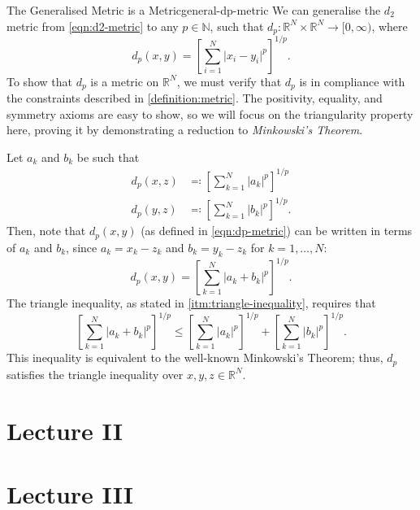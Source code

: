 \documentclass{article}
\numberwithin{equation}{section}
\numberwithin{enumi}{section}
\begin{document}
\begin{theorem}{The Generalised Metric is a Metric}{general-dp-metric}
    We can generalise the $d_2$ metric from \cref{eqn:d2-metric} to any $ p
    \in \mathbb{N} $, such that $ d_p \colon \mathbb{R}^N \times \mathbb{R}^N
    \to [0, \infty) $, where
    \begin{equation}
        d_p(x, y) = \left[\sum_{i=1}^N \vert x_i - y_i \vert^p\right]^{1/p}.
        \label{eqn:dp-metric}
    \end{equation}
    To show that $ d_p $ is a metric on $ \mathbb{R}^N $, we must verify that $
    d_p $ is in compliance with the constraints described in
    \cref{definition:metric}. The positivity, equality, and symmetry axioms are
    easy to show, so we will focus on the triangularity property here, proving
    it by demonstrating a reduction to \emph{Minkowski's Theorem}.

    Let $ a_k $ and $ b_k $ be such that
    \begin{align}
        d_p(x, z) &\eqcolon \left[\sum_{k=1}^N \vert a_k \vert^p\right]^{1/p} \\
        d_p(y, z) &\eqcolon \left[\sum_{k=1}^N \vert b_k \vert^p\right]^{1/p}.
    \end{align}
    Then, note that $ d_p(x, y) $ (as defined in \cref{eqn:dp-metric}) can be
    written in terms of $ a_k $ and $ b_k $, since $ a_k = x_k - z_k $ and $ b_k
    = y_k - z_k $ for $ k = 1, \ldots, N $:
    \begin{equation}
        d_p(x, y) = \left[\sum_{k=1}^N \vert a_k + b_k \vert^p\right]^{1/p}.
    \end{equation}
    The triangle inequality, as stated in \cref{itm:triangle-inequality},
    requires that
    \begin{equation}
        \left[\sum_{k=1}^N \vert a_k + b_k \vert^p\right]^{1/p} \leq
        \left[\sum_{k=1}^N \vert a_k \vert^p\right]^{1/p} +
        \left[\sum_{k=1}^N \vert b_k \vert^p\right]^{1/p}.
    \end{equation}
    This inequality is equivalent to the well-known Minkowski's Theorem; thus,
    $ d_p $ satisfies the triangle inequality over $ x, y, z \in \mathbb{R}^N $.
\end{theorem}
\section{Lecture II}
\section{Lecture III}
\end{document}

